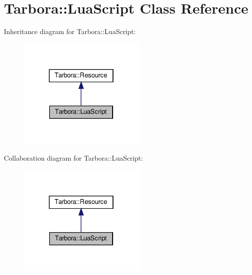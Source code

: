 \hypertarget{classTarbora_1_1LuaScript}{}\section{Tarbora\+:\+:Lua\+Script Class Reference}
\label{classTarbora_1_1LuaScript}


Inheritance diagram for Tarbora\+:\+:Lua\+Script\+:\nopagebreak
\begin{figure}[H]
\begin{center}
\leavevmode
\includegraphics[width=178pt]{classTarbora_1_1LuaScript__inherit__graph}
\end{center}
\end{figure}


Collaboration diagram for Tarbora\+:\+:Lua\+Script\+:\nopagebreak
\begin{figure}[H]
\begin{center}
\leavevmode
\includegraphics[width=178pt]{classTarbora_1_1LuaScript__coll__graph}
\end{center}
\end{figure}
